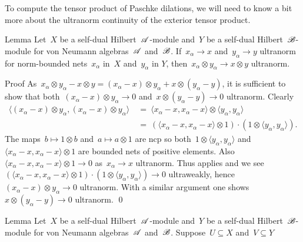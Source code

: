 \documentclass[b]{subfiles}
\begin{document}
\begin{parsec}%
\begin{point}%
To compute the tensor product of Paschke dilations,
    we will need to know a bit more about
    the ultranorm continuity of the exterior tensor product.
\end{point}
\begin{point}{Lemma}%
Let~$X$ be a self-dual Hilbert~$\mathscr{A}$-module
    and~$Y$ be a self-dual Hilbert~$\mathscr{B}$-module
    for von Neumann algebras~$\mathscr{A}$ and~$\mathscr{B}$.
If~$x_\alpha \to x$ and~$y_\alpha \to y$ ultranorm
    for norm-bounded nets~$x_\alpha$ in~$X$ and~$y_\alpha$ in $Y$,
    then~$x_\alpha \otimes y_\alpha \to x \otimes y$ ultranorm.
\begin{point}{Proof}%
As~$x_\alpha \otimes y_\alpha - x \otimes y
            = (x_\alpha -x )\otimes y_\alpha + x\otimes (y_\alpha - y)$,
            it is sufficient
    to show that both~$(x_\alpha -x) \otimes y_\alpha \to 0$
    and~$x\otimes (y_\alpha - y) \to 0$ ultranorm.
Clearly
\begin{align*}
    \langle (x_\alpha - x) \otimes y_\alpha,
        (x_\alpha - x) \otimes y_\alpha \rangle
    & \ = \ 
    \langle x_\alpha - x , x_\alpha - x \rangle\otimes 
    \langle y_\alpha ,y_\alpha \rangle \\
    & \ = \ 
    (\langle x_\alpha - x , x_\alpha - x \rangle\otimes 1) \cdot (1 \otimes 
    \langle y_\alpha ,y_\alpha \rangle ).
\end{align*}
The maps~$b \mapsto 1 \otimes b$ and~$a \mapsto a \otimes 1$
    are ncp %
    so both~$1 \otimes \langle y_\alpha, y_\alpha \rangle$
    and~$\langle x_\alpha - x , x_\alpha - x \rangle\otimes 1$
    are bounded nets of positive elements.
    Also~$\langle x_\alpha - x , x_\alpha - x \rangle\otimes 1 \to 0$
        as~$x_\alpha \to x$ ultranorm.
Thus \sref{vanishing-effects} applies and we see
    $(\langle x_\alpha - x , x_\alpha - x \rangle\otimes 1) \cdot (1 \otimes 
    \langle y_\alpha ,y_\alpha \rangle ) \to 0$ ultraweakly,
    hence~$(x_\alpha - x) \otimes y_\alpha \to 0$ ultranorm.
With a similar argument
    one shows~$x\otimes (y_\alpha - y) \to 0$ ultranorm. \qed
\end{point}
\end{point}
\begin{point}{Lemma}%
Let~$X$ be a self-dual Hilbert~$\mathscr{A}$-module
    and~$Y$ be a self-dual Hilbert~$\mathscr{B}$-module
    for von Neumann algebras~$\mathscr{A}$ and~$\mathscr{B}$.
Suppose~$U \subseteq X$ and~$V \subseteq Y$

\end{point}
\end{parsec}
\end{document}
